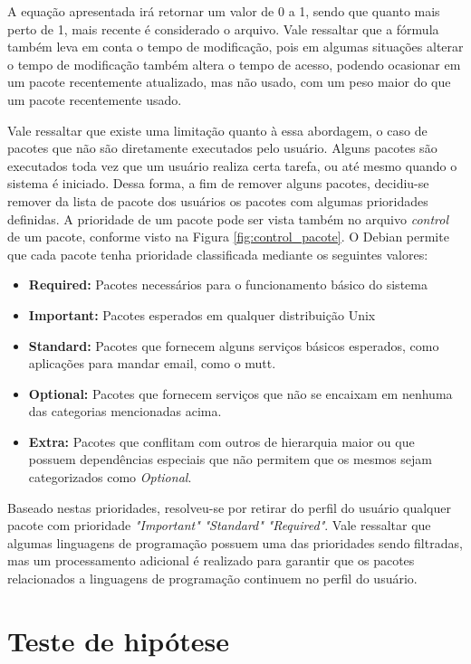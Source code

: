 A equação apresentada irá retornar um valor de 0 a 1, sendo que quanto mais
perto de 1, mais recente é considerado o arquivo. Vale ressaltar que a fórmula
também leva em conta o tempo de modificação, pois em algumas situações alterar o
tempo de modificação também altera o tempo de acesso, podendo ocasionar em um
pacote recentemente atualizado, mas não usado, com um peso maior do que um
pacote recentemente usado.

Vale ressaltar que existe uma limitação quanto à essa abordagem, o caso de
pacotes que não são diretamente executados pelo usuário. Alguns pacotes são
executados toda vez que um usuário realiza certa tarefa, ou até mesmo quando o
sistema é iniciado. Dessa forma, a fim de remover alguns pacotes, decidiu-se
remover da lista de pacote dos usuários os pacotes com algumas prioridades definidas.
A prioridade de um pacote pode ser vista também no arquivo \textit{control} de um pacote, conforme visto
na Figura \ref{fig:control_pacote}. O Debian permite que cada pacote tenha
prioridade classificada mediante os seguintes valores:

\begin{itemize}
    \item \textbf{Required:} Pacotes necessários para o funcionamento básico do
        sistema
    \item \textbf{Important:} Pacotes esperados em qualquer distribuição Unix
    \item \textbf{Standard:} Pacotes que fornecem alguns serviços básicos
        esperados, como aplicações para mandar email, como o mutt.
    \item \textbf{Optional:} Pacotes que fornecem serviços que não se encaixam
        em nenhuma das categorias mencionadas acima.
    \item \textbf{Extra:} Pacotes que conflitam com outros de hierarquia maior
        ou que possuem dependências especiais que não permitem que os mesmos
        sejam categorizados como \textit{Optional}.
\end{itemize}

Baseado nestas prioridades, resolveu-se por retirar do perfil do usuário
qualquer pacote com prioridade \textit{"Important"} \textit{"Standard"}
\textit{"Required"}. Vale ressaltar que algumas linguagens de programação
possuem uma das prioridades sendo filtradas, mas um processamento adicional é
realizado para garantir que os pacotes relacionados a linguagens de programação
continuem no perfil do usuário.

\section{Teste de hipótese}

